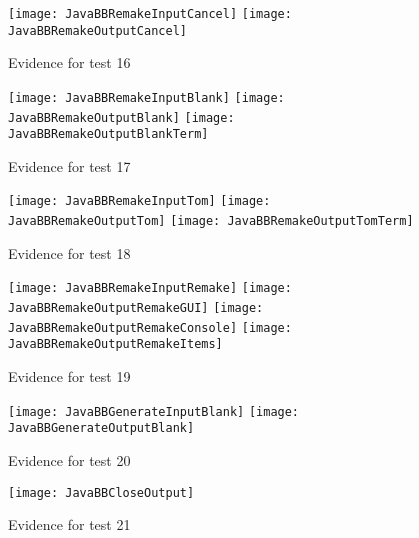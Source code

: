 \documentclass[
11pt, %
a4paper, %
oneside, %
headinclude,footinclude, %
BCOR5mm, %
]{scrartcl}
\begin{document}
\begin{appendices}
{{{{{{{{{{{{{{\begin{figure}[H]
	\centering
	\texttt{[image: JavaBBRemakeInputCancel]}
	\texttt{[image: JavaBBRemakeOutputCancel]}
	\caption[Evidence C.2.1 Test 16]{Evidence for test 16}
	\label{javabbtes16}	
\end{figure}
\begin{figure}[H]
	\centering
	\texttt{[image: JavaBBRemakeInputBlank]}
	\texttt{[image: JavaBBRemakeOutputBlank]}
	\texttt{[image: JavaBBRemakeOutputBlankTerm]}
	\caption[Evidence C.2.1 Test 17]{Evidence for test 17}
	\label{javabbtes17}	
\end{figure}
\begin{figure}[H]
	\centering
	\texttt{[image: JavaBBRemakeInputTom]}
	\texttt{[image: JavaBBRemakeOutputTom]}
	\texttt{[image: JavaBBRemakeOutputTomTerm]}
	\caption[Evidence C.2.1 Test 18]{Evidence for test 18}
	\label{javabbtes18}	
\end{figure}
\begin{figure}[H]
	\centering
	\texttt{[image: JavaBBRemakeInputRemake]}
	\texttt{[image: JavaBBRemakeOutputRemakeGUI]}
	\texttt{[image: JavaBBRemakeOutputRemakeConsole]}
	\texttt{[image: JavaBBRemakeOutputRemakeItems]}
	\caption[Evidence C.2.1 Test 19]{Evidence for test 19}
	\label{javabbtes19}	
\end{figure}
\begin{figure}[H]
	\centering
	\texttt{[image: JavaBBGenerateInputBlank]}
	\texttt{[image: JavaBBGenerateOutputBlank]}
	\caption[Evidence C.2.1 Test 20]{Evidence for test 20}
	\label{javabbtes20}	
\end{figure}
\begin{figure}[H]
	\centering
	\texttt{[image: JavaBBCloseOutput]}
	\caption[Evidence C.2.1 Test 21]{Evidence for test 21}
	\label{javabbtes21}	
\end{figure}
}}}}}}}}}}}}}}
\end{appendices}
\end{document}
